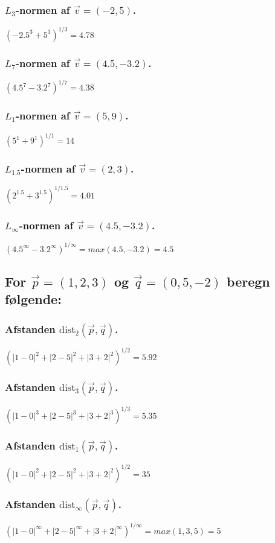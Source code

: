 \documentclass[12pt, a4paper]{article}
\begin{document}
			\subsubsection{$L_3$-normen af $\vec{v}=(-2,5)$.}
				$(-2.5^3+5^3)^{1/3}=4.78$
			\subsubsection{$L_7$-normen af $\vec{v}=(4.5,-3.2)$.}
				$(4.5^7-3.2^7)^{1/7}=4.38$
			\subsubsection{$L_1$-normen af $\vec{v}=(5,9)$.}
				$(5^1+9^1)^{1/1}=14$
			\subsubsection{$L_{1.5}$-normen af $\vec{v}=(2,3)$.}
				$(2^{1.5}+3^{1.5})^{1/1.5}=4.01$
			\subsubsection{$L_\infty$-normen af $\vec{v}=(4.5,-3.2)$.}
			$(4.5^\infty -3.2^\infty )^{1/\infty}=max(4.5,-3.2)=4.5$
		\subsection{For $\vec{p}=(1,2,3)$ og $\vec{q}=(0,5,-2)$ beregn følgende:}
			\subsubsection{Afstanden $\text{dist}_2(\vec{p},\vec{q})$.}
				$(|1-0|^2+|2-5|^2+|3+2|^2)^{1/2}=5.92$
			\subsubsection{Afstanden $\text{dist}_3(\vec{p},\vec{q})$.}
				$(|1-0|^3+|2-5|^3+|3+2|^3)^{1/3}=5.35$
			\subsubsection{Afstanden $\text{dist}_1(\vec{p},\vec{q})$.}
				$(|1-0|^2+|2-5|^2+|3+2|^2)^{1/2}=35$
			\subsubsection{Afstanden $\text{dist}_\infty(\vec{p},\vec{q})$.}
			$(|1-0|^\infty+|2-5|^\infty+|3+2|^\infty)^{1/\infty}=max(1,3,5)=5$
\end{document}
